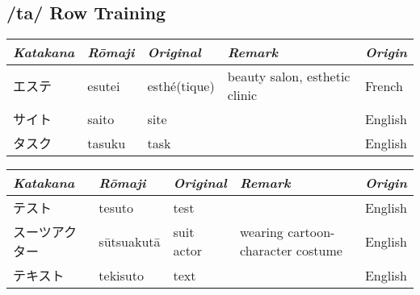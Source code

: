 \subsection{/ta/ Row Training}
\Padding
\begin{longtable}[c]{p{2cm}p{2cm}p{3cm}p{6cm}p{2cm}}
\textit{Katakana}&\textit{Rōmaji}&\textit{Original}&\textit{Remark}&\textit{Origin}\\\hline
エステ        &esutei    &esthé(tique)&beauty salon, esthetic clinic    &French\\
サイト        &saito     &site        &&English\\
タスク        &tasuku    &task        &&English\\
\end{longtable}



\newpage
\Padding
\begin{longtable}[c]{p{2.6cm}p{2cm}p{1.8cm}p{6.6cm}p{1.8cm}}
\textit{Katakana}&\textit{Rōmaji}&\textit{Original}&\textit{Remark}&\textit{Origin}\\\hline
テスト        &tesuto    &test        &                                 &English\\
スーツアクター&sūtsuakutā&suit actor  &wearing cartoon-character costume&English\\
テキスト      &tekisuto  &text        &                                 &English\\
\end{longtable}



\newpage
